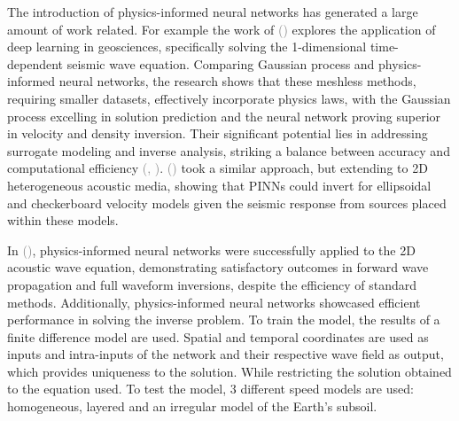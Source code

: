 \documentclass[11pt,twoside]{article}
\renewcommand{\citep}[2][]{\textcolor{gray}{(\citeauthor{#2}, \citeyear[#1]{#2})}}
\renewcommand{\citeauthoryear}[2][]{\textcolor{gray}{\citeauthor{#2} (\textcolor{gray}{\citeyear[#1]{#2}})}}
\begin{document}
The introduction of physics-informed neural networks has generated a large amount of work related. For example the work of \citeauthoryear{karimpouli_physics_2020} explores the application of deep learning in geosciences, specifically solving the 1-dimensional time-dependent seismic wave equation. Comparing Gaussian process and physics-informed neural networks, the research shows that these meshless methods, requiring smaller datasets, effectively incorporate physics laws, with the Gaussian process excelling in solution prediction and the neural network proving superior in velocity and density inversion. Their significant potential lies in addressing surrogate modeling and inverse analysis, striking a balance between accuracy and computational efficiency \citep{Song2022}. \citeauthoryear{rash_2022} took a similar approach, but extending to 2D heterogeneous acoustic media, showing that PINNs could invert for ellipsoidal and checkerboard velocity models given the seismic response from sources placed within these models.



In \citeauthoryear{moseley_physics-informed_2022}, physics-informed neural networks were successfully applied to the 2D acoustic wave equation, demonstrating satisfactory outcomes in forward wave propagation and full waveform inversions, despite the efficiency of standard methods. Additionally, physics-informed neural networks showcased efficient performance in solving the inverse problem. To train the model, the results of a finite difference model are used. Spatial and temporal coordinates are used as inputs and intra-inputs of the network and their respective wave field as output, which provides uniqueness to the solution. While restricting the solution obtained to the equation used. To test the model, 3 different speed models are used: homogeneous, layered and an irregular model of the Earth's subsoil.


\end{document}
